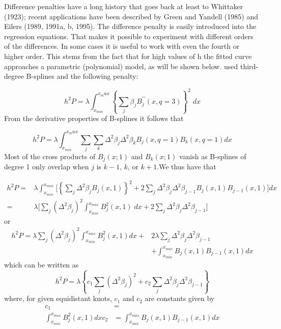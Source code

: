 \documentclass[12pt]{article}
\begin{document}
Difference penalties have a long history that goes back at least to Whittaker (1923); recent applications have been described by Green and Yandell (1985) and Eilers (1989, 1991a, b, 1995).
The difference penalty is easily introduced into the regression equations. That makes it possible to experiment with different orders of the differences. In some cases it is useful to work with even the fourth or higher order. This stems from the fact that for high values of h the fitted curve approaches a parametric (polynomial) model, as will be shown below.
\cite{o1986statistical} used third-degree B-splines and the following penalty:

\begin{equation} \label{osullivan_univariate_bspline_penalty}
h^2 P = \lambda \int_{x_{min}}^{x_max} \left\{ \sum_{j}  \beta_j B_j^{\prime \prime} \left(x, q=3\right) \right\}^2\; dx
\end{equation}
\noindent
From the derivative properties of B-splines it follows that

\begin{equation} \label{osullivan_univariate_bspline_penalty_via_deriv}
h^2 P = \lambda \int_{x_{min}}^{x_max}  \sum_{j} \sum_{k} \Delta^2 \beta_j \Delta^2 \beta_k B_j\left(x,q=1\right)B_k\left(x,q=1\right) dx 
\end{equation}
\noindent
Most of the cross products of $B_j(x; 1)$ and $B_k(x;1)$ vanish as B-splines of degree 1 only overlap when $j$ is $k-1$, $k$, or $k+1$.We thus have that

\begin{align}
h^2 P = {} & \lambda \int_{x_{min}}^{x_{max}} \bigg[ \left\{ \sum_{j}  \Delta^2 \beta_j  B_j\left(x,1\right)  \right\}^2  + 2 \sum_{j}\Delta^2 \beta_j\Delta^2 \beta_{j-1}B_j\left(x,1\right)B_{j-1}\left(x,1\right) \bigg] dx \nonumber \\ 
= {} & \lambda \bigg[ \sum_j \left( \Delta^2\beta_j \right)^2 \int_{x_{min}}^{x_{max}} B_j^2\left(x,1\right)\;dx + 2 \sum_j \Delta^2 \beta_j\Delta^2 \beta_{j-1} \bigg]
\end{align}
\noindent
or
\begin{align}
h^2 P = \lambda \sum_j \left( \Delta^2\beta_j \right)^2 \int_{x_{min}}^{x_{max}} B_j^2\left(x,1\right) dx + {} & 2\lambda \sum_j \Delta^2 \beta_j \Delta^2 \beta_{j-1}  \nonumber \\ 
{} &+\int_{x_{min}}^{x_{max}} B_j\left(x,1\right)B_{j-1}\left(x,1\right) dx
\end{align}
\noindent
which can be written as
\begin{equation}
h^2 P = \lambda\left\{c_1 \sum_j\left( \Delta^2 \beta_j\right)^2 + c_2 \sum_j\Delta^2 \beta_j\Delta^2 \beta_{j-1} \right\}
\end{equation}
\noindent
where, for given equidistant knots, $c_1$ and $c_2$ are constants given by
\begin{equation}
\begin{split}
c_1 & =  \\ \int_{x_{min}}^{x_{max}} B_j^2\left(x,1\right) dx
c_2 & = \int_{x_{min}}^{x_{max}} B_j\left(x,1\right)B_{j-1}\left(x,1\right) dx
\end{split}
\end{equation}
\end{document}
